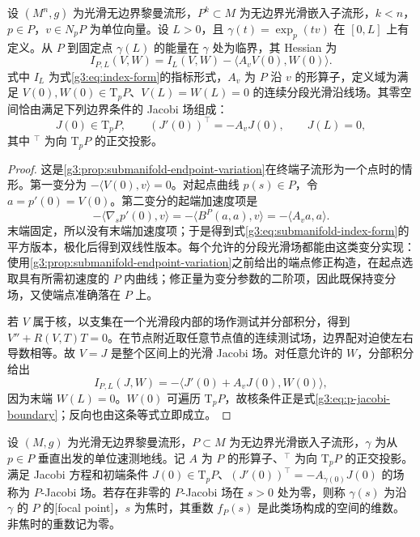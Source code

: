 \begin{proposition}\label{g3:prop:submanifold-index-boundary}
	设 \((M^n,g)\) 为光滑无边界黎曼流形，\(P^k\subset M\) 为无边界光滑嵌入子流形，\(k<n\)，\(p\in P\)，\(v\in N_pP\) 为单位向量。设 \(L>0\)，且 \(\gamma(t)=\exp_p(tv)\) 在 \([0,L]\) 上有定义。从 \(P\) 到固定点 \(\gamma(L)\) 的能量在 \(\gamma\) 处为临界，其 Hessian 为
	\begin{equation}\label{g3:eq:submanifold-index-form}
		I_{P,L}(V,W)=I_L(V,W)-\langle A_vV(0),W(0)\rangle.
	\end{equation}
	式中 \(I_L\) 为式\eqref{g3:eq:index-form}的指标形式，\(A_v\) 为 \(P\) 沿 \(v\) 的形算子，定义域为满足 \(V(0),W(0)\in\mathrm T_pP\)、\(V(L)=W(L)=0\) 的连续分段光滑沿线场。其零空间恰由满足下列边界条件的 Jacobi 场组成：
	\begin{equation}\label{g3:eq:p-jacobi-boundary}
		J(0)\in\mathrm T_pP,\qquad
		(J'(0))^\top=-A_vJ(0),\qquad J(L)=0,
	\end{equation}
	其中 \({}^\top\) 为向 \(\mathrm T_pP\) 的正交投影。
\end{proposition}
\begin{proof}
	这是\cref{g3:prop:submanifold-endpoint-variation}在终端子流形为一个点时的情形。第一变分为 \(-\langle V(0),v\rangle=0\)。对起点曲线 \(p(s)\in P\)，令 \(a=p'(0)=V(0)\)。第二变分的起端加速度项是
	\[
		-\langle\nabla_s p'(0),v\rangle
		=-\langle B^P(a,a),v\rangle=-\langle A_va,a\rangle.
	\]
	末端固定，所以没有末端加速度项；于是得到式\eqref{g3:eq:submanifold-index-form}的平方版本，极化后得到双线性版本。每个允许的分段光滑场都能由这类变分实现：使用\cref{g3:prop:submanifold-endpoint-variation}之前给出的端点修正构造，在起点选取具有所需初速度的 \(P\) 内曲线；修正量为变分参数的二阶项，因此既保持变分场，又使端点准确落在 \(P\) 上。

	若 \(V\) 属于核，以支集在一个光滑段内部的场作测试并分部积分，得到 \(V''+R(V,T)T=0\)。在节点附近取任意节点值的连续测试场，边界配对迫使左右导数相等。故 \(V=J\) 是整个区间上的光滑 Jacobi 场。对任意允许的 \(W\)，分部积分给出
	\[
		I_{P,L}(J,W)
		=-\langle J'(0)+A_vJ(0),W(0)\rangle,
	\]
	因为末端 \(W(L)=0\)。\(W(0)\) 可遍历 \(\mathrm T_pP\)，故核条件正是式\eqref{g3:eq:p-jacobi-boundary}；反向也由这条等式立即成立。
\end{proof}

\begin{definition}\label{g3:def:focal-point}
	设 \((M,g)\) 为光滑无边界黎曼流形，\(P\subset M\) 为无边界光滑嵌入子流形，\(\gamma\) 为从 \(p\in P\) 垂直出发的单位速测地线。记 \(A\) 为 \(P\) 的形算子、\({}^\top\) 为向 \(\mathrm T_pP\) 的正交投影。满足 Jacobi 方程和初端条件
	\(J(0)\in\mathrm T_pP\)、\((J'(0))^\top=-A_{\dot\gamma(0)}J(0)\)
	的场称为 \(P\)-Jacobi 场。若存在非零的 \(P\)-Jacobi 场在 \(s>0\) 处为零，则称 \(\gamma(s)\) 为沿 \(\gamma\) 的 \(P\) 的[focal point]，\(s\) 为焦时，其重数 \(f_P(s)\) 是此类场构成的空间的维数。非焦时的重数记为零。
\end{definition}

